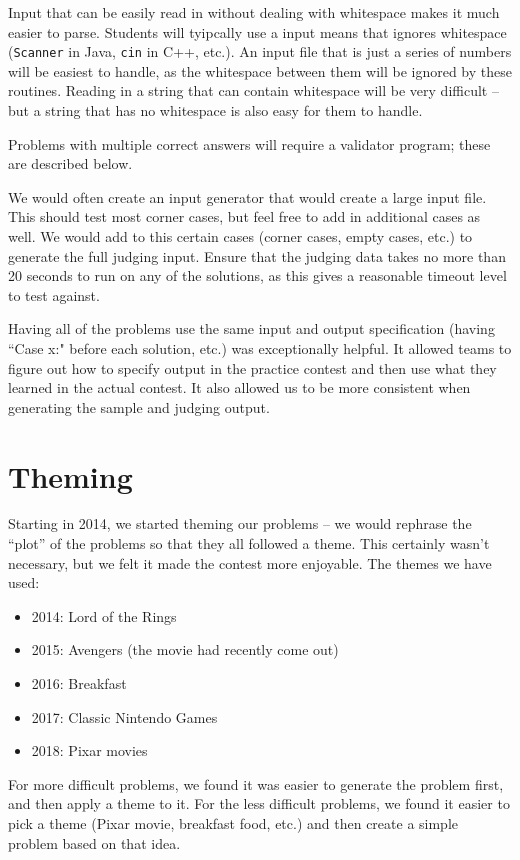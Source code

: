 \documentclass[11pt,twoside,letterpaper]{book}
\newenvironment{itemlist}{
\begin{itemize}
\setlength{\itemsep}{0pt}
\setlength{\parskip}{0pt}}
{\end{itemize}}
\begin{document}
Input that can be easily read in without dealing with whitespace makes
it much easier to parse.  Students will tyipcally use a input means
that ignores whitespace ({\tt Scanner} in Java, {\tt cin} in C++,
etc.).  An input file that is just a series of numbers will be easiest
to handle, as the whitespace between them will be ignored by these
routines.  Reading in a string that can contain whitespace will be
very difficult -- but a string that has no whitespace is also easy for
them to handle.

Problems with multiple correct answers will require a validator
program; these are described below.

We would often create an input generator that would create a large
input file.  This should test most corner cases, but feel free to add
in additional cases as well.  We would add to this certain cases
(corner cases, empty cases, etc.) to generate the full judging input.
Ensure that the judging data takes no more than 20 seconds to run on
any of the solutions, as this gives a reasonable timeout level to test
against.

Having all of the problems use the same input and output specification
(having ``Case x:" before each solution, etc.) was exceptionally
helpful. It allowed teams to figure out how to specify output in the
practice contest and then use what they learned in the actual contest.
It also allowed us to be more consistent when generating the sample
and judging output.


\section{Theming}

Starting in 2014, we started theming our problems -- we would rephrase
the ``plot'' of the problems so that they all followed a theme.  This
certainly wasn't necessary, but we felt it made the contest more
enjoyable.  The themes we have used:

\begin{itemlist}
\item 2014: Lord of the Rings
\item 2015: Avengers (the movie had recently come out)
\item 2016: Breakfast
\item 2017: Classic Nintendo Games
\item 2018: Pixar movies
\end{itemlist}

For more difficult problems, we found it was easier to generate the
problem first, and then apply a theme to it.  For the less difficult
problems, we found it easier to pick a theme (Pixar movie, breakfast
food, etc.) and then create a simple problem based on that idea.
\end{document}
